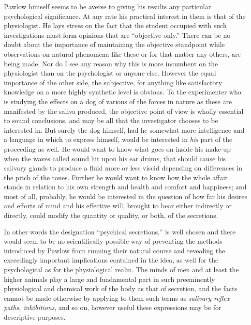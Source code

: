 \documentclass[a4paper, 11pt, oneside, polutonikogreek, english, landscape]{article}
\begin{document}
Pawlow himself seems to be averse to giving his results any particular psychological significance. At any rate his practical interest in them is that of the physiologist. He lays stress on the fact that the student occupied with such investigations must form opinions that are ``objective only.'' There can be no doubt about the importance of maintaining the objective standpoint while observations on natural phenomena like these or for that matter any others, are being made. Nor do I see any reason why this is more incumbent on the physiologist than on the psychologist or anyone else. However the equal importance of the other side, the subjective, for anything like satisfactory knowledge on a more highly synthetic level is obvious. To the experimenter who is studying the effects on a dog of various of the forces in nature as these are manifested by the saliva produced, the objective point of view is wholly essential to sound conclusions, and may be all that the investigator chooses to be interested in. But surely the dog himself, had he somewhat more intelligence and a language in which to express himself, would be interested in \emph{his} part of the proceeding as well. He would want to know what goes on inside his make-up when the waves called sound hit upon his ear drums, that should cause his salivary glands to produce a fluid more or less viscid depending on differences in the pitch of the tones. Further he would want to know how the whole affair stands in relation to his own strength and health and comfort and happiness; and most of all, probably, he would be interested in the question of how far his desires and efforts of mind and his effective will, brought to bear either indirectly or directly, could modify the quantity or quality, or both, of the secretions.

In other words the designation ``psychical secretions,'' is well chosen and there would seem to be no scientifically possible way of preventing the methods introduced by Pawlow from running their natural course and revealing the exceedingly important implications contained in the idea, as well for the psychological as for the physiological realm. The minds of men and at least the higher animals play a large and fundamental part in such preeminently physiological and chemical work of the body as that of secretion, and the facts cannot be made otherwise by applying to them such terms as \emph{salivary reflex paths, inhibitions}, and so on, however useful these expressions may be for descriptive purposes.
\end{document}
